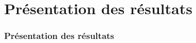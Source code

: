 \section{Présentation des résultats}
\begin{frame}
\frametitle{Présentation des résultats}

\end{frame}
